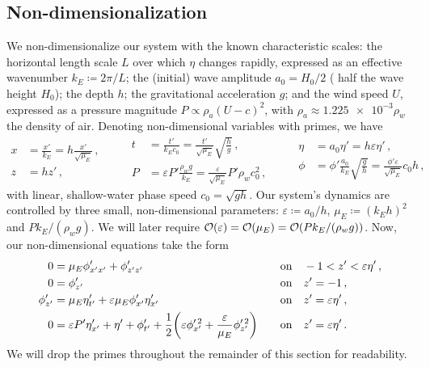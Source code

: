 \documentclass{jfm}
\renewcommand*{\epsilon}{\varepsilon}
\begin{document}
\subsection{\label{sec:nondim} Non-dimensionalization}
We non-dimensionalize our system with the known characteristic
scales: the horizontal length scale $L$ over which $\eta$ changes
rapidly, expressed as an effective wavenumber $k_E \coloneqq 2 \pi/L$;
the (initial) wave amplitude $a_0 = H_0/2$ (\ie{} half the wave height
$H_0$); the depth $h$; the gravitational acceleration $g$; and the wind
speed $U$,
expressed as a pressure magnitude $P \propto \rho_a (U-c)^2$,
with $\rho_a \approx \num{1.225e-3} \rho_w$ the density of air.
Denoting non-dimensional variables with primes, we have
\begin{equation}
  \begin{aligned}
  x &= \frac{x'}{k_E} = h \frac{x'}{\sqrt{\mu_E}}\,, \\
  z &= h z' \,,
  \end{aligned}
  \qquad
  \begin{aligned}
  t &= \frac{t'}{k_E c_0}
    = \frac{t'}{\sqrt{\mu_E}} \sqrt{\frac{h}{g}} \,, \\
  P &= \epsilon P' \frac{\rho_w g}{k_E}
    = \frac{\epsilon}{\sqrt{\mu_E}} P' \rho_w c_0^2 \,,
  \end{aligned}
  \qquad
  \begin{aligned}
  \eta &= a_0 \eta' = h \epsilon \eta' \,, \\
  \phi &= \phi'\frac{a_0}{k_E}\sqrt{\frac{g}{h}}
    = \frac{\phi'\epsilon}{\sqrt{\mu_E}} c_0 h \,,
  \end{aligned}
  \label{eq:nondim_expressions}
\end{equation}
with linear, shallow-water phase speed $c_0 = \sqrt{g h}$.
Our system's dynamics are controlled by three small, non-dimensional
parameters: $\epsilon \coloneqq a_0/h$, $\mu_E \coloneqq (k_E h)^2$ and
$P k_E/(\rho_w g)$.
We will later require $\order{\epsilon} = \order{\mu_E} =
\order{Pk_E/(\rho_w g)}$.
Now, our non-dimensional equations take the form
\begin{alignat}{2}
  0 &= \mu_E \phi'_{x'x'} + \phi'_{z'z'} &&\qq{on}
    -1 < z' < \epsilon \eta' \,, \label{eq:laplace_nondim} \\
  0 &= \phi'_{z'} &&\qq{on} z'=-1 \,, \label{eq:bottom_bc_nondim} \\
  \phi'_{z'} &= \mu_E \eta'_{t'} +
    \epsilon \mu_E \phi'_{x'} \eta'_{x'} &&\qq{on} z' = \epsilon \eta' \,,
    \label{eq:kinematic_bc_nondim} \\
  0 &= \epsilon P' \eta'_{x'} +  \eta' + \phi'_{t'} + \frac{1}{2}
    \pqty{\epsilon \phi_{x'}^{\prime \, 2} + \frac{\epsilon}{\mu_E}
    \phi_{z'}^{\prime \, 2}} &&\qq{on} z'= \epsilon \eta' \,.
    \label{eq:dynamic_bc_nondim}
\end{alignat}
We will drop the primes throughout the remainder of this section for readability.
\end{document}
